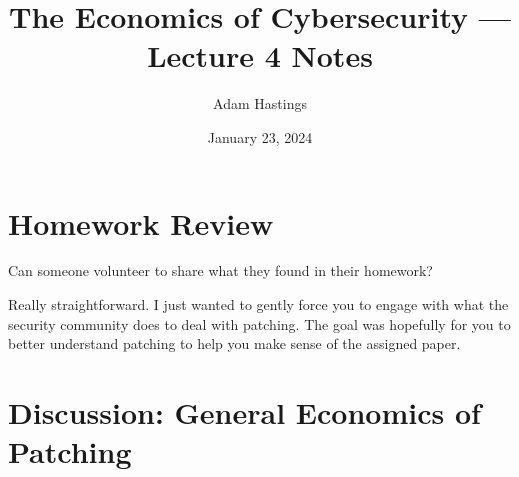 \documentclass[11pt]{article}
\title{The Economics of Cybersecurity --- Lecture 4 Notes}
\date{January 23, 2024}
\author{Adam Hastings}
\begin{document}
\maketitle


\section*{Homework Review}

Can someone volunteer to share what they found in their homework?

Really straightforward. I just wanted to gently force you to engage with what the security community does to deal with patching. The goal was hopefully for you to better understand patching to help you make sense of the assigned paper. 

\section*{Discussion: General Economics of Patching}
\end{document}
